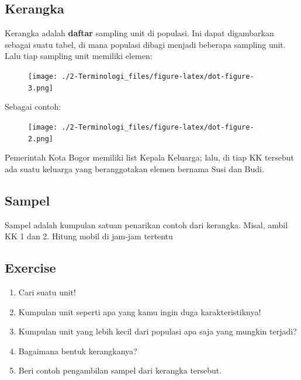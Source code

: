 \documentclass[
  letterpaper,
  DIV=11,
  numbers=noendperiod]{scrreprt}
\providecommand{\tightlist}{%
  \setlength{\itemsep}{0pt}\setlength{\parskip}{0pt}}\usepackage{longtable,booktabs,array}
\begin{document}
\hypertarget{kerangka}{%
\subsection{Kerangka}\label{kerangka}}

Kerangka adalah \textbf{daftar} sampling unit di populasi. Ini dapat
digambarkan sebagai suatu tabel, di mana populasi dibagi menjadi
beberapa sampling unit. Lalu tiap sampling unit memiliki elemen:

\begin{figure}[H]

{\centering \texttt{[image: ./2-Terminologi\_files/figure-latex/dot-figure-3.png]}

}

\end{figure}

Sebagai contoh:

\begin{figure}[H]

{\centering \texttt{[image: ./2-Terminologi\_files/figure-latex/dot-figure-2.png]}

}

\end{figure}

Pemerintah Kota Bogor memiliki list Kepala Keluarga; lalu, di tiap KK
tersebut ada suatu keluarga yang beranggotakan elemen bernama Susi dan
Budi.

\hypertarget{sampel}{%
\subsection{Sampel}\label{sampel}}

Sampel adalah kumpulan satuan penarikan contoh dari kerangka. Misal,
ambil KK 1 dan 2. Hitung mobil di jam-jam tertentu

\hypertarget{exercise-1}{%
\subsection{Exercise}\label{exercise-1}}

\begin{enumerate}
\def\labelenumi{\arabic{enumi}.}
\tightlist
\item
  Cari suatu unit!
\item
  Kumpulan unit seperti apa yang kamu ingin duga karakteristiknya!
\item
  Kumpulan unit yang lebih kecil dari populasi apa saja yang mungkin
  terjadi?
\item
  Bagaimana bentuk kerangkanya?
\item
  Beri contoh pengambilan sampel dari kerangka tersebut.
\end{enumerate}
\end{document}
